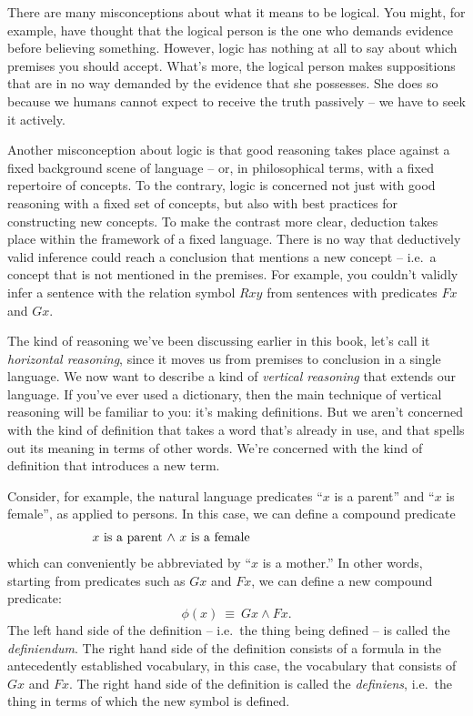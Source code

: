 There are many misconceptions about what it means to be logical.  You
might, for example, have thought that the logical person is the one
who demands evidence before believing something.  However, logic has
nothing at all to say about which premises you should accept.  What's
more, the logical person makes suppositions that are in no way
demanded by the evidence that she possesses.  She does so because we
humans cannot expect to receive the truth passively -- we have to seek
it actively.

Another misconception about logic is that good reasoning takes place
against a fixed background scene of language -- or, in philosophical
terms, with a fixed repertoire of concepts.  To the contrary, logic is
concerned not just with good reasoning with a fixed set of concepts,
but also with best practices for constructing new concepts.  To make
the contrast more clear, deduction takes place within the framework of
a fixed language.  There is no way that deductively valid inference
could reach a conclusion that mentions a new concept -- i.e.\ a
concept that is not mentioned in the premises.  For example, you
couldn't validly infer a sentence with the relation symbol $Rxy$ from
sentences with predicates $Fx$ and $Gx$.

The kind of reasoning we've been discussing earlier in this book,
let's call it \textit{horizontal reasoning}, since it moves us from
premises to conclusion in a single language.  We now want to describe
a kind of \textit{vertical reasoning} that extends our language.  If
you've ever used a dictionary, then the main technique of vertical
reasoning will be familiar to you: it's making definitions.  But we
aren't concerned with the kind of definition that takes a word that's
already in use, and that spells out its meaning in terms of other
words.  We're concerned with the kind of definition that introduces a
new term.

Consider, for example, the natural language predicates ``$x$ is a
parent'' and ``$x$ is female'', as applied to persons.  In this case, we
can define a compound predicate
\[ \begin{array}{p{8cm}} $x$ is a parent $\wedge$ $x$ is a
     female \end{array} \] which
can conveniently be abbreviated by ``$x$ is a mother.''  In other
words, starting from predicates such as $Gx$ and $Fx$, we can
define a new compound predicate:
\[ \phi (x)\:\equiv \: Gx\wedge Fx .\] The left hand side of the
definition -- i.e.\ the thing being defined -- is called the
\emph{definiendum}. The right hand side of the definition consists of
a formula in the antecedently established vocabulary, in this case,
the vocabulary that consists of $Gx$ and $Fx$.  The right hand side of
the definition is called the \emph{definiens}, i.e.\ the thing in
terms of which the new symbol is defined.

